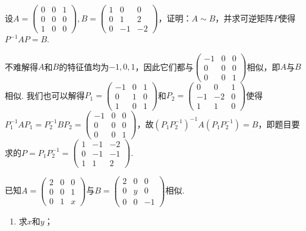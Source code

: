 \begin{exercise}
\begin{exgroup}
        \item 设$A=\begin{pmatrix}
                0 & 0 & 1 \\ 0 & 0 & 0 \\ 1 & 0 & 0
            \end{pmatrix},B=\begin{pmatrix}
                1 & 0 & 0 \\ 0 & 1 & 2 \\ 0 & -1 & -2
            \end{pmatrix}$，证明：$A\sim B$，并求可逆矩阵$P$使得$P^{-1}AP=B$.
        \begin{answer}
            不难解得$A$和$B$的特征值均为$-1,0,1$，因此它们都与$\begin{pmatrix}
                -1 & 0 & 0 \\ 0 & 0 & 0 \\ 0 & 0 & 1
            \end{pmatrix}$相似，即$A$与$B$相似. 我们也可以解得$P_1=\begin{pmatrix}
                -1 & 0 & 1 \\ 0 & 1 & 0 \\ 1 & 0 & 1
            \end{pmatrix}$和$P_2=\begin{pmatrix}
                0 & 0 & 1 \\ -1 & -2 & 0 \\ 1 & 1 & 0
            \end{pmatrix}$使得$P_1^{-1}AP_1=P_2^{-1}BP_2=\begin{pmatrix}
                -1 & 0 & 0 \\ 0 & 0 & 0 \\ 0 & 0 & 1
            \end{pmatrix}$，故$(P_1P_2^{-1})^{-1}A(P_1P_2^{-1})=B$，即题目要求的$P=P_1P_2^{-1}=\begin{pmatrix}
                1 & -1 & -2 \\ 0 & -1 & -1 \\ 1 & 1 & 2
            \end{pmatrix}$.
        \end{answer}

        \item 已知$A=\begin{pmatrix}
                2 & 0 & 0 \\ 0 & 0 & 1 \\ 0 & 1 & x
            \end{pmatrix}$与$B=\begin{pmatrix}
                2 & 0 & 0 \\ 0 & y & 0 \\ 0 & 0 & -1
            \end{pmatrix}$相似.
        \begin{enumerate}
            \item 求$x$和$y$；


\end{enumerate}
\end{exgroup}
\end{exercise}

